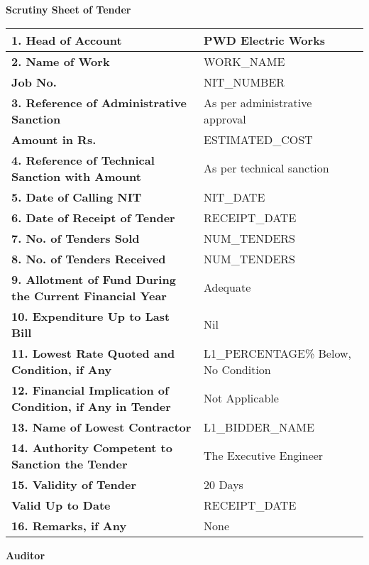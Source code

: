 \documentclass[a4paper]{article}
\begin{document}
\begin{center}
    \textbf{\Large Scrutiny Sheet of Tender}
\end{center}

\begin{tabular}{|p{}|p{}|}
    \hline
    \large \textbf{1. Head of Account} & \large PWD Electric Works \\
    \hline
    \large \textbf{2. Name of Work} & \large {WORK_NAME} \\
    \large \textbf{Job No.} & \large {NIT_NUMBER} \\
    \hline
    \large \textbf{3. Reference of Administrative Sanction} & \large As per administrative approval \\
    \large \textbf{Amount in Rs.} & \large {ESTIMATED_COST} \\
    \hline
    \large \textbf{4. Reference of Technical Sanction with Amount} & \large As per technical sanction \\
    \hline
    \large \textbf{5. Date of Calling NIT} & \large {NIT_DATE} \\
    \hline
    \large \textbf{6. Date of Receipt of Tender} & \large {RECEIPT_DATE} \\
    \hline
    \large \textbf{7. No. of Tenders Sold} & \large {NUM_TENDERS} \\
    \hline
    \large \textbf{8. No. of Tenders Received} & \large {NUM_TENDERS} \\
    \hline
    \large \textbf{9. Allotment of Fund During the Current Financial Year} & \large Adequate \\
    \hline
    \large \textbf{10. Expenditure Up to Last Bill} & \large Nil \\
    \hline
    \large \textbf{11. Lowest Rate Quoted and Condition, if Any} & \large {L1_PERCENTAGE}\% Below, No Condition \\
    \hline
    \large \textbf{12. Financial Implication of Condition, if Any in Tender} & \large Not Applicable \\
    \hline
    \large \textbf{13. Name of Lowest Contractor} & \large {L1_BIDDER_NAME} \\
    \hline
    \large \textbf{14. Authority Competent to Sanction the Tender} & \large The Executive Engineer \\
    \hline
    \large \textbf{15. Validity of Tender} & \large 20 Days \\
    \large \textbf{Valid Up to Date} & \large {RECEIPT_DATE} \\
    \hline
    \large \textbf{16. Remarks, if Any} & \large None \\
    \hline
\end{tabular}

\vspace{1cm}
\begin{flushleft}
    \large \textbf{Auditor}
\end{flushleft}
\end{document}
